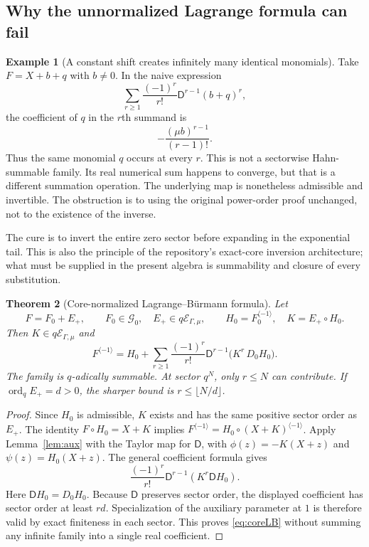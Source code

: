 \documentclass[11pt,a4paper]{article}
\newtheorem{theorem}{Theorem}[section]
\theoremstyle{definition}
\newtheorem{example}[theorem]{Example}
\theoremstyle{remark}
\newcommand{\E}{\mathcal E_{\Gamma,\mu}}
\newcommand{\ordq}{\operatorname{ord}_q}
\newcommand{\rev}{^{\langle-1\rangle}}
\newcommand{\D}{\mathsf D}
\begin{document}
\subsection{Why the unnormalized Lagrange formula can fail}
\begin{example}[A constant shift creates infinitely many identical monomials]
Take $F=X+b+q$ with $b\ne0$. In the naive expression
\[
 \sum_{r\ge1}\frac{(-1)^r}{r!}\D^{r-1}(b+q)^r,
\]
the coefficient of $q$ in the $r$th summand is
\[
 -\frac{(\mu b)^{r-1}}{(r-1)!}.
\]
Thus the same monomial $q$ occurs at every $r$. This is not a sectorwise
Hahn-summable family. Its real numerical sum happens to converge, but that
is a different summation operation. The underlying map is nonetheless
admissible and invertible. The obstruction is to using the original
power-order proof unchanged, not to the existence of the inverse.
\end{example}

The cure is to invert the entire zero sector before expanding in the
exponential tail. This is also the principle of the repository's
exact-core inversion architecture; what must be supplied in the present
algebra is summability and closure of every substitution.

\begin{theorem}[Core-normalized Lagrange--B\"urmann formula]\label{thm:coreLB}
Let
\[
 F=F_0+E_+,\qquad F_0\in\mathcal G_0,\quad E_+\in q\E,
 \qquad H_0=F_0\rev,\quad K=E_+\circ H_0.
\]
Then $K\in q\E$ and
\begin{equation}\label{eq:coreLB}
 F\rev=H_0+
 \sum_{r\ge1}\frac{(-1)^r}{r!}
 \D^{r-1}\bigl(K^r\,D_0H_0\bigr).
\end{equation}
The family is $q$-adically summable. At sector $q^N$, only $r\le N$ can
contribute. If $\ordq E_+=d>0$, the sharper bound is $r\le\lfloor N/d\rfloor$.
\end{theorem}
\begin{proof}
Since $H_0$ is admissible, $K$ exists and has the same positive sector order
as $E_+$. The identity $F\circ H_0=X+K$ implies
$F\rev=H_0\circ(X+K)\rev$. Apply Lemma~\ref{lem:aux} with the Taylor map
for $\D$, with $\phi(z)=-K(X+z)$ and $\psi(z)=H_0(X+z)$. The general
coefficient formula gives
\[
 \frac{(-1)^r}{r!}\D^{r-1}(K^r\D H_0).
\]
Here $\D H_0=D_0H_0$. Because $\D$ preserves sector order, the displayed
coefficient has sector order at least $rd$. Specialization of the auxiliary
parameter at $1$ is therefore valid by exact finiteness in each sector.
This proves \eqref{eq:coreLB} without summing any infinite family into a
single real coefficient.
\end{proof}
\end{document}
